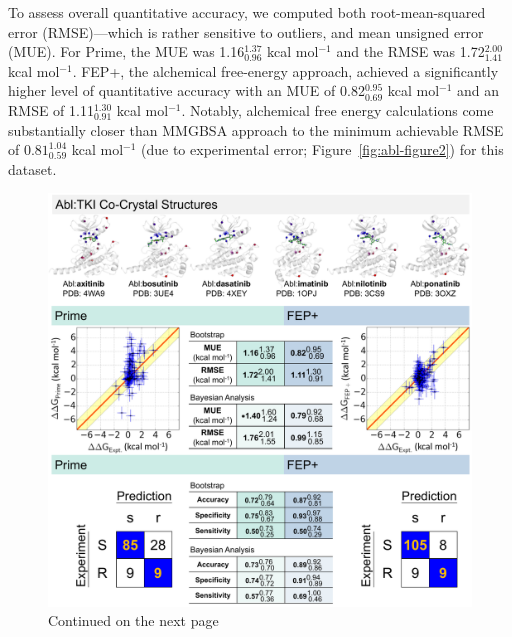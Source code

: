 \documentclass[phd,tocprelim]{cornell}
\begin{document}
To assess overall quantitative accuracy, we computed both root-mean-squared error (RMSE)---which is rather sensitive to outliers, and mean unsigned error (MUE).
For Prime, the MUE was 1.16$^{1.37}_{0.96}$ kcal mol$^{-1}$ and the RMSE was 1.72$^{2.00}_{1.41}$ kcal mol$^{-1}$. 
FEP+, the alchemical free-energy approach, achieved a significantly higher level of quantitative accuracy with an MUE of 0.82$^{0.95}_{0.69}$ kcal mol$^{-1}$ and an RMSE of 1.11$^{1.30}_{0.91}$ kcal mol$^{-1}$.
Notably, alchemical free energy calculations come substantially closer than MMGBSA approach to the minimum achievable RMSE of $0.81^{1.04}_{0.59}$ kcal mol$^{-1}$ (due to experimental error; Figure~\ref{fig:abl-figure2}) for this dataset.


\begin{landscape}
	\begin{figure}[p]
		\centering
		\includegraphics[width=0.7\linewidth]{figures/abl-figure-3.pdf}
		\caption[Comparison of experimentally-measured binding free-energy changes ($\Delta \Delta$G) for 131 clinically observed mutations and 6 selective kinase inhibitors for which co-crystal structures of wild-type kinase with inhibitor are available.]{
		Continued on the next page 
	}
		\label{fig:abl-figure3}
	\end{figure}
\end{landscape}
\addtocounter{figure}{-1}
\end{document}
